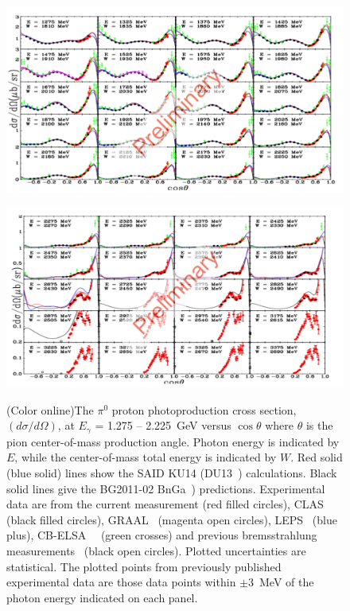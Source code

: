 \begin{figure}[h!]
	\centering
	\begin{minipage}{.50\textwidth}
		\centering
		\includegraphics[width=225 pt, height = 160 pt]{figures/pi0_xsectionI.pdf}
		\caption{}{}
		\label{fig:pi0I}
	\end{minipage}%
	\centering
	\begin{minipage}{.50\textwidth}
		\centering
		\includegraphics[width=225 pt, height = 160 pt]{figures/pi0_xsectionII.pdf}
		\caption{(Color online)The $\pi^0$ proton photoproduction cross section, $(d\sigma/d\Omega)$, at $E_{\gamma}$ = 1.275 -- 2.225~GeV versus $\cos\theta$ where $\theta$ is the pion center-of-mass production angle. Photon energy is indicated by $E$, while the center-of-mass total energy is indicated by $W$. Red solid (blue solid) lines show the SAID KU14 (DU13~\protect\cite{Dugger13}) calculations. Black solid lines give the BG2011-02 BnGa~\protect\cite{BonnGat}) predictions. Experimental data are from the current measurement (red filled circles), CLAS~\protect\cite{Dugger07} (black filled circles), GRAAL~\protect\cite{Graal} (magenta open circles), LEPS~\protect\cite{LEPS} (blue plus), CB-ELSA~\protect\cite{ELSA05}~\cite{ELSA11} (green crosses) and previous bremsstrahlung measurements~\protect\cite{brem} (black open circles). Plotted uncertainties are statistical. The plotted points from previously published experimental data are those data points within $\pm$3~MeV of the photon energy indicated on each panel.}{}
		\label{fig:pi0II}
	\end{minipage}
\end{figure}


